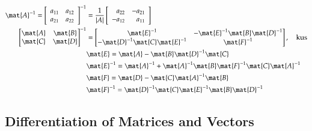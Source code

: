 \documentclass[a4paper]{article}
\numberwithin{equation}{subsection}
\begin{document}
\begin{align}
 \mat{A}^{-1} = \left[
 \begin{array}{rr}
 a_{11} & a_{12}\\
 a_{21} & a_{22}
 \end{array}
 \right]^{-1} & =
 \frac{1}{|A|} \left[
 \begin{array}{rr}
  a_{22}        & -a_{21}\\
 -a_{12}        & a_{11}
 \end{array}
 \right] \\
%
\begin{bmatrix}
\mat{A}      & \mat{B} \\
\mat{C}      & \mat{D}
\end{bmatrix}^{-1} &=
\begin{bmatrix}
\mat{E}^{-1}                      & -\mat{E}^{-1}\mat{B}\mat{D}^{-1} \\
-\mat{D}^{-1}\mat{C}\mat{E}^{-1}  & \mat{F}^{-1}
\end{bmatrix}, \quad\mbox{kus} \\
&\mat{E}        = \mat{A} - \mat{B}\mat{D}^{-1}\mat{C} \notag\\
&\mat{E}^{-1}   = \mat{A}^{-1} + \mat{A}^{-1}\mat{B}\mat{F}^{-1} \mat{C} \mat{A}^{-1} \notag\\
&\mat{F}             = \mat{D} - \mat{C} \mat{A}^{-1} \mat{B} \notag\\
&\mat{F}^{-1}        = \mat{D}^{-1} \mat{C} \mat{E}^{-1} \mat{B} \mat{D}^{-1} \notag\\
\end{align}


\subsection{Differentiation of Matrices and Vectors}
\end{document}
